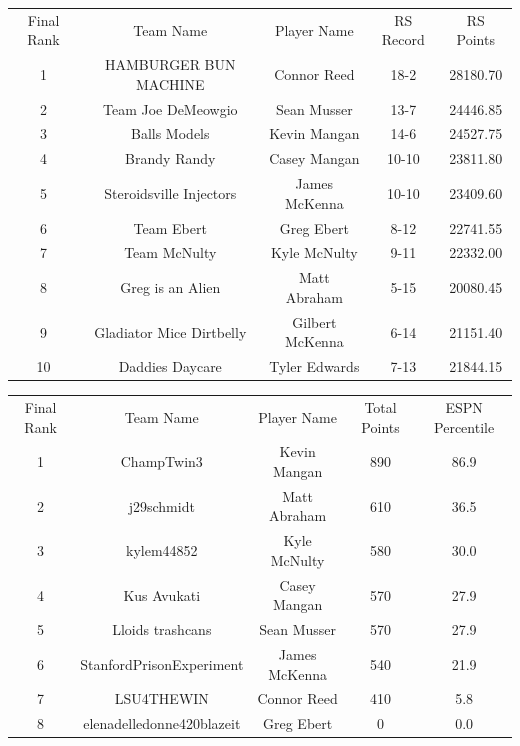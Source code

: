 \documentclass[11pt,letterpaper]{article}
\begin{document}
\newpage
{}
\vspace{-25pt}
\begin{table} [h]
\begin{center}
\begin{tabular} { c c c c c }
\\ Final Rank & Team Name & Player Name & RS Record & RS Points
\\ 1  & HAMBURGER BUN MACHINE & Connor Reed & 18-2 & 28180.70
\\ 2  & Team Joe DeMeowgio & Sean Musser & 13-7 & 24446.85
\\ 3  & Balls Models & Kevin Mangan & 14-6 & 24527.75
\\ 4  & Brandy Randy & Casey Mangan & 10-10 & 23811.80
\\ 5  & Steroidsville Injectors & James McKenna & 10-10 & 23409.60
\\ 6  & Team Ebert & Greg Ebert & 8-12 & 22741.55
\\ 7  & Team McNulty & Kyle McNulty & 9-11 & 22332.00
\\ 8  & Greg is an Alien & Matt Abraham & 5-15 & 20080.45
\\ 9  & Gladiator Mice Dirtbelly & Gilbert McKenna & 6-14 & 21151.40
\\ 10  & Daddies Daycare & Tyler Edwards & 7-13 & 21844.15
\end{tabular}
\end{center}
\end{table}


\newpage
{}
\vspace{-25pt}
\begin{table} [h]
\begin{center}
\begin{tabular} { c c c c c }
\\ Final Rank & Team Name & Player Name & Total Points & ESPN Percentile
\\ 1  & ChampTwin3 & Kevin Mangan & 890 & 86.9
\\ 2 & j29schmidt & Matt Abraham & 610 & 36.5
\\ 3 & kylem44852 & Kyle McNulty & 580 & 30.0
\\ 4 & Kus Avukati & Casey Mangan & 570 & 27.9
\\ 5 & Lloids trashcans & Sean Musser & 570 & 27.9
\\ 6 & StanfordPrisonExperiment & James McKenna & 540 & 21.9
\\ 7 & LSU4THEWIN & Connor Reed & 410 & 5.8
\\ 8 & elenadelledonne420blazeit & Greg Ebert & 0 & 0.0
\end{tabular}
\end{center}
\end{table}
\end{document}

